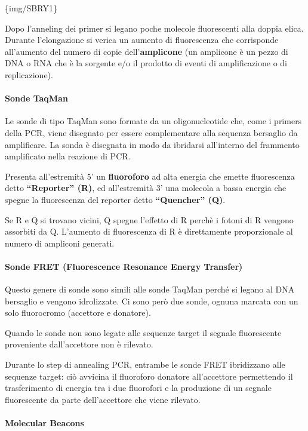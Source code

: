 \documentclass[]{article}
\begin{document}
\{img/SBRY1\}

Dopo l'anneling dei primer si legano poche molecole fluorescenti alla
doppia elica. Durante l'elongazione si verica un aumento di fluorescenza
che corrisponde all'aumento del numero di copie dell'\textbf{amplicone}
(un amplicone è un pezzo di DNA o RNA che è la sorgente e/o il prodotto
di eventi di amplificazione o di replicazione).

\paragraph{Sonde TaqMan}\label{sonde-taqman}

Le sonde di tipo TaqMan sono formate da un oligonucleotide che, come i
primers della PCR, viene disegnato per essere complementare alla
sequenza bersaglio da amplificare. La sonda è disegnata in modo da
ibridarsi all'interno del frammento amplificato nella reazione di PCR.

Presenta all'estremità 5' un \textbf{fluoroforo} ad alta energia che
emette fluorescenza detto \textbf{``Reporter'' (R)}, ed all'estremità 3'
una molecola a bassa energia che spegne la fluorescenza del reporter
detto \textbf{``Quencher'' (Q)}.

Se R e Q si trovano vicini, Q spegne l'effetto di R perchè i fotoni di R
vengono assorbiti da Q. L'aumento di fluorescenza di R è direttamente
proporzionale al numero di ampliconi generati.

\paragraph{Sonde FRET (Fluorescence Resonance Energy
Transfer)}\label{sonde-fret-fluorescence-resonance-energy-transfer}

Questo genere di sonde sono simili alle sonde TaqMan perché si legano al
DNA bersaglio e vengono idrolizzate. Ci sono però due sonde, ognuna
marcata con un solo fluorocromo (accettore e donatore).

Quando le sonde non sono legate alle sequenze target il segnale
fluorescente proveniente dall'accettore non è rilevato.

Durante lo step di annealing PCR, entrambe le sonde FRET ibridizzano
alle sequenze target: ciò avvicina il fluoroforo donatore all'accettore
permettendo il trasferimento di energia tra i due fluorofori e la
produzione di un segnale fluorescente da parte dell'accettore che viene
rilevato.

\paragraph{Molecular Beacons}\label{molecular-beacons}
\end{document}
